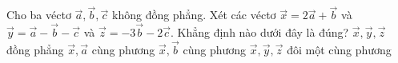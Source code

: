 \begin{ex}%
	 Cho ba véctơ $\overrightarrow{a},\overrightarrow{b},\overrightarrow{c}$ không đồng phẳng. Xét các véctơ $\overrightarrow{x}=2\overrightarrow{a}+\overrightarrow{b}$ và $\overrightarrow{y}=\overrightarrow{a}-\overrightarrow{b}-\overrightarrow{c}$ và $\overrightarrow{z}=-3\overrightarrow{b}-2\overrightarrow{c}$. Khẳng định nào dưới đây là đúng?
	 \choice
		{\True $\overrightarrow{x},\overrightarrow{y},\overrightarrow{z}$ đồng  phẳng}
		 {$\overrightarrow{x},\overrightarrow{a}$ cùng phương}
		 {$\overrightarrow{x},\overrightarrow{b}$ cùng phương}
		{$\overrightarrow{x},\overrightarrow{y},\overrightarrow{z}$ đôi một cùng  phương}
\end{ex}



